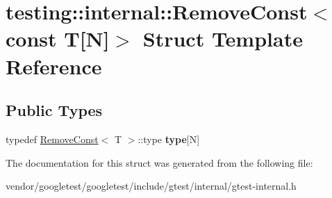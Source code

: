 \hypertarget{structtesting_1_1internal_1_1_remove_const_3_01const_01_t[_n]_4}{}\section{testing\+:\+:internal\+:\+:Remove\+Const$<$ const T\mbox{[}N\mbox{]}$>$ Struct Template Reference}
\label{structtesting_1_1internal_1_1_remove_const_3_01const_01_t[_n]_4}
\subsection*{Public Types}
\begin{DoxyCompactItemize}
\item 
\mbox{\label{structtesting_1_1internal_1_1_remove_const_3_01const_01_t[_n]_4_ac976b53cb5d031a120fafbe790650068}} 
typedef \hyperlink{structtesting_1_1internal_1_1_remove_const}{Remove\+Const}$<$ T $>$\+::type {\bfseries type}\mbox{[}N\mbox{]}
\end{DoxyCompactItemize}


The documentation for this struct was generated from the following file\+:\begin{DoxyCompactItemize}
\item 
vendor/googletest/googletest/include/gtest/internal/gtest-\/internal.\+h\end{DoxyCompactItemize}
